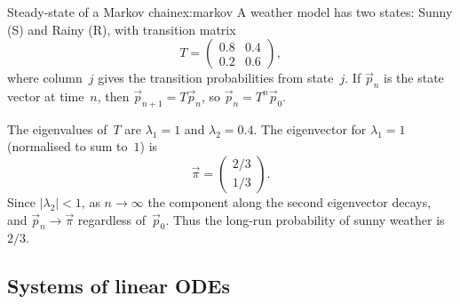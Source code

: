 \begin{example}{Steady-state of a Markov chain}{ex:markov}
A weather model has two states: Sunny (S) and Rainy (R), with
transition matrix
\[
  T = \begin{pmatrix} 0.8 & 0.4 \\ 0.2 & 0.6 \end{pmatrix},
\]
where column~$j$ gives the transition probabilities from state~$j$.
If $\vec{p}_n$ is the state vector at time~$n$, then
$\vec{p}_{n+1} = T\vec{p}_n$, so $\vec{p}_n = T^n\vec{p}_0$.

The eigenvalues of~$T$ are $\lambda_1 = 1$ and $\lambda_2 = 0.4$.
The eigenvector for $\lambda_1 = 1$ (normalised to sum to~$1$) is
\[
  \vec{\pi} = \begin{pmatrix} 2/3 \\ 1/3 \end{pmatrix}.
\]
Since $|\lambda_2| < 1$, as $n\to\infty$ the component along the
second eigenvector decays, and
$\vec{p}_n \to \vec{\pi}$ regardless of~$\vec{p}_0$.  Thus the
long-run probability of sunny weather is~$2/3$.
\end{example}

\subsection{Systems of linear ODEs}\label{subsec:odes}

